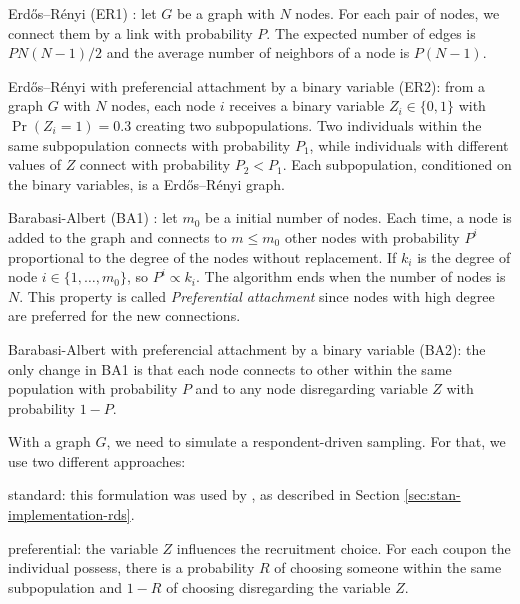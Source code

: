 \begin{alineas}
  \item Erdős–Rényi (ER1) \cite{erdos1960evolution}: let $G$ be a graph with $N$
  nodes. For each pair of nodes, we connect them by a link with probability
  $P$. The expected number of edges is $PN(N-1)/2$ and the average number of
  neighbors of a node is $P(N-1)$. 
  \item Erdős–Rényi with preferencial attachment by a binary variable (ER2):
  from a graph $G$ with $N$ nodes, each
  node $i$ receives a binary variable $Z_i \in \{0,1\}$ with $\Pr(Z_i =
  1) = 0.3$ creating two subpopulations. Two individuals within the same
  subpopulation connects with probability $P_1$, while individuals with
  different values of $Z$ connect with probability $P_2 < P_1$. Each
  subpopulation, conditioned on the binary variables, is a Erdős–Rényi
  graph. 
  \item Barabasi-Albert (BA1) \cite{barabasi1999emergence}: let $m_0$ be a
  initial number of nodes. Each time, a node is added to the graph and connects
  to $m \le m_0$ other nodes with probability $P^i$ proportional to the degree of
  the nodes without replacement. If $k_i$ is the degree of node $i \in \{1, \dots,
  m_0\}$, so $P^i \propto k_i$. The algorithm ends when the number of nodes
  is $N$. This property is called {\em Preferential attachment} since nodes
  with high degree are preferred for the new connections. 
  \item Barabasi-Albert with preferencial attachment by a binary variable
  (BA2): the only change in BA1 is that each node connects to other within the
  same population with probability $P$ and to any node disregarding variable
  $Z$ with probability $1- P$.
\end{alineas}

With a graph $G$, we need to simulate a respondent-driven sampling. For that,
we use two different approaches: 
\begin{alineas}
  \item standard: this formulation was used by \textcite[p.
  14670]{baraff2016estimating}, as described in Section
  \ref{sec:stan-implementation-rds}. 
  \item preferential: the variable $Z$ influences the recruitment choice. For
  each coupon the individual possess, there is a probability $R$ of choosing
  someone within the same subpopulation and $1-R$ of choosing disregarding the
  variable $Z$. 
\end{alineas}

